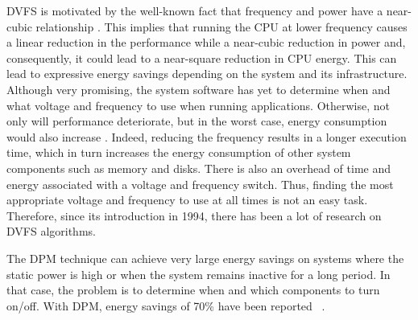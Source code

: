 DVFS is motivated by the well-known fact that frequency and power have a near-cubic relationship \cite{Dayarathna2016DataSurvey, Group2012HandbookSahni}. 
This implies that running the CPU at lower frequency causes a linear reduction in the performance while a near-cubic reduction in power and, consequently, it could lead to a near-square reduction in CPU energy. 
This can lead to expressive energy savings depending on the system and its infrastructure.
Although very promising, the system software has yet to determine when and what voltage and frequency to use when running applications.
Otherwise, not only will performance deteriorate, but in the worst case, energy consumption would also increase  \cite{Group2012HandbookSahni}.
Indeed, reducing the frequency results in a longer execution time, which in turn increases the energy consumption of other system components such as memory and disks.
There is also an overhead of time and energy associated with a voltage and frequency switch.
Thus, finding the most appropriate voltage and frequency to use at all times is not an easy task.
Therefore, since its introduction in 1994, there has been a lot of research on DVFS algorithms.

The DPM technique can achieve very large energy savings on systems where the static power is high or when the system remains inactive for a long period.
In that case, the problem is to determine when and which components to turn on/off.
With DPM, energy savings of 70\% have been reported ~\cite{Shuja2012Energy-efficientCenters, Benini2000AManagement}.

